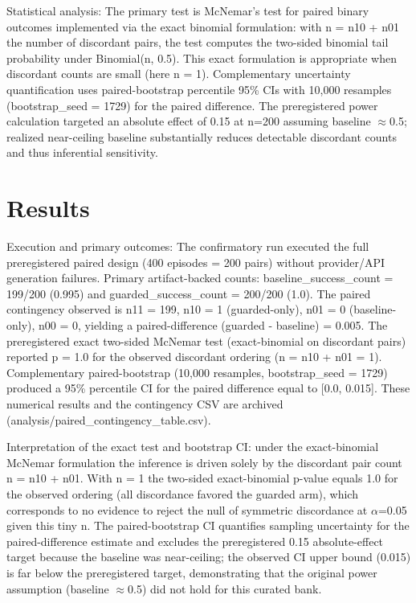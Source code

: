\documentclass[conference]{IEEEtran}
\begin{document}
Statistical analysis: The primary test is McNemar's test for paired binary outcomes implemented via the exact binomial formulation: with n = n10 + n01 the number of discordant pairs, the test computes the two-sided binomial tail probability under Binomial(n, 0.5). This exact formulation is appropriate when discordant counts are small (here n = 1). Complementary uncertainty quantification uses paired-bootstrap percentile 95\% CIs with 10,000 resamples (bootstrap\_seed = 1729) for the paired difference. The preregistered power calculation targeted an absolute effect of 0.15 at n=200 assuming baseline \ensuremath{\approx}0.5; realized near-ceiling baseline substantially reduces detectable discordant counts and thus inferential sensitivity.

\section{Results}
Execution and primary outcomes: The confirmatory run executed the full preregistered paired design (400 episodes = 200 pairs) without provider/API generation failures. Primary artifact-backed counts: baseline\_success\_count = 199/200 (0.995) and guarded\_success\_count = 200/200 (1.0). The paired contingency observed is n11 = 199, n10 = 1 (guarded-only), n01 = 0 (baseline-only), n00 = 0, yielding a paired-difference (guarded - baseline) = 0.005. The preregistered exact two-sided McNemar test (exact-binomial on discordant pairs) reported p = 1.0 for the observed discordant ordering (n = n10 + n01 = 1). Complementary paired-bootstrap (10,000 resamples, bootstrap\_seed = 1729) produced a 95\% percentile CI for the paired difference equal to [0.0, 0.015]. These numerical results and the contingency CSV are archived (analysis/paired\_contingency\_table.csv).

Interpretation of the exact test and bootstrap CI: under the exact-binomial McNemar formulation the inference is driven solely by the discordant pair count n = n10 + n01. With n = 1 the two-sided exact-binomial p-value equals 1.0 for the observed ordering (all discordance favored the guarded arm), which corresponds to no evidence to reject the null of symmetric discordance at \ensuremath{\alpha}=0.05 given this tiny n. The paired-bootstrap CI quantifies sampling uncertainty for the paired-difference estimate and excludes the preregistered 0.15 absolute-effect target because the baseline was near-ceiling; the observed CI upper bound (0.015) is far below the preregistered target, demonstrating that the original power assumption (baseline \ensuremath{\approx}0.5) did not hold for this curated bank.
\end{document}

